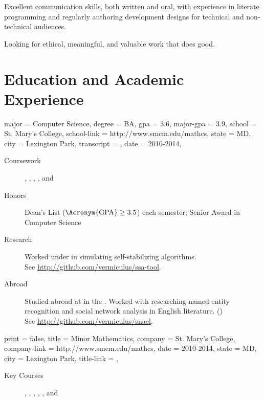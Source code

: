 \documentclass{simplecv}
\begin{document}
\begin{minipage}{\textwidth}
\begin{tabular}{rHH}
  \end{tabular}

  \medskip

  Excellent communication skills, both written and oral, with
  experience in literate programming and regularly authoring
  development designs for technical and non-technical audiences.

  \medskip

  Looking for ethical, meaningful, and valuable work that does good.

\end{minipage}

\vfill
\section{Education and Academic Experience}
\begin{education}
  {
    major = Computer Science,
    degree = BA,
    gpa = 3.6,
    major-gpa = 3.9,
    school = St. Mary's College,
    school-link = http://www.smcm.edu/mathcs,
    state = MD,
    city = Lexington Park,
    transcript = \transcript,
    date = 2010-2014,
  }

\begin{description}
\item[Coursework]
  ,
  ,
  ,
  ,
  and
\item[Honors] Dean's List ($\text{\Acronym{GPA}} \geq 3.5$) each semester;
  Senior Award in Computer Science
\item[Research] Worked under  in simulating
  self-stabilizing algorithms.
  \\
  See \url{http://github.com/vermiculus/ssa-tool}.
\item[Abroad] Studied abroad at \href{http://www.ucd.ie}{} in the .
  Worked with  researching named-entity recognition and social network
  analysis in English literature. ()
  \\
  See \url{http://github.com/vermiculus/snael}.
\end{description}
\end{education}

\begin{position}
  {
    print   = false,
    title   = Minor \Dash Mathematics,
    company = St. Mary's College,
    company-link = http://www.smcm.edu/mathcs,
    date    = 2010-2014,
    state   = MD,
    city    = Lexington Park,
    title-link = \transcript,
  }

  \begin{description}
  \item[Key Courses]
    ,
    ,
    ,
    ,
    ,
    and
  \end{description}
\end{position}
\end{document}

